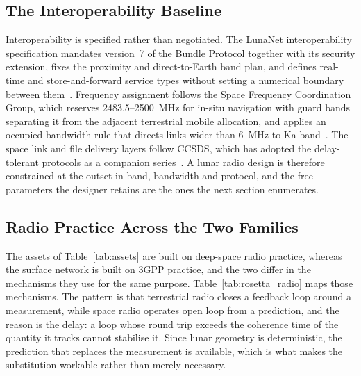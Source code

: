 \documentclass[11pt,a4paper]{article}
\begin{document}
\subsection{The Interoperability Baseline}
Interoperability is specified rather than negotiated. The LunaNet interoperability specification mandates version~7 of the Bundle Protocol together with its security extension, fixes the proximity and direct-to-Earth band plan, and defines real-time and store-and-forward service types without setting a numerical boundary between them~\cite{lnis_v5}. Frequency assignment follows the Space Frequency Coordination Group, which reserves \SI{2483.5}{}--\SI{2500}{MHz} for in-situ navigation with guard bands separating it from the adjacent terrestrial mobile allocation, and applies an occupied-bandwidth rule that directs links wider than \SI{6}{MHz} to Ka-band~\cite{sfcg_rec32}. The space link and file delivery layers follow CCSDS, which has adopted the delay-tolerant protocols as a companion series~\cite{ccsds_bp,ccsds_ltp,ccsds_lunar_standards}. A lunar radio design is therefore constrained at the outset in band, bandwidth and protocol, and the free parameters the designer retains are the ones the next section enumerates.

\subsection{Radio Practice Across the Two Families}
The assets of Table~\ref{tab:assets} are built on deep-space radio practice, whereas the surface network is built on 3GPP practice, and the two differ in the mechanisms they use for the same purpose. Table~\ref{tab:rosetta_radio} maps those mechanisms. The pattern is that terrestrial radio closes a feedback loop around a measurement, while space radio operates open loop from a prediction, and the reason is the delay: a loop whose round trip exceeds the coherence time of the quantity it tracks cannot stabilise it. Since lunar geometry is deterministic, the prediction that replaces the measurement is available, which is what makes the substitution workable rather than merely necessary.
\end{document}

